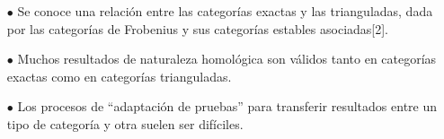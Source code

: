 \documentclass[preview]{standalone}
\begin{document}
\begin{center}
\begin{itemize}
                        \item[$\bullet$] Se conoce una relación entre las categorías exactas y las trianguladas, dada por las categorías de Frobenius y sus categorías estables asociadas[2].
                        \item[$\bullet$] Muchos resultados de naturaleza homológica son válidos tanto en categorías exactas como en categorías trianguladas.
                        \item[$\bullet$] Los procesos de ``adaptación de pruebas'' para transferir resultados entre un tipo de categoría y otra suelen ser difíciles.
                        \end{itemize}
\end{center}
\end{document}
